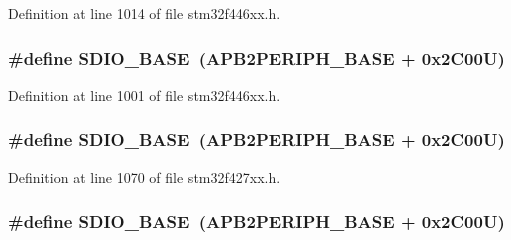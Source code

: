 Definition at line 1014 of file stm32f446xx.\+h.

\subsubsection[{\texorpdfstring{S\+D\+I\+O\+\_\+\+B\+A\+SE}{SDIO_BASE}}]{\setlength{\rightskip}{0pt plus 5cm}\#define S\+D\+I\+O\+\_\+\+B\+A\+SE~({\bf A\+P\+B2\+P\+E\+R\+I\+P\+H\+\_\+\+B\+A\+SE} + 0x2\+C00\+U)}\hypertarget{group___peripheral__memory__map_ga95dd0abbc6767893b4b02935fa846f52}{}\label{group___peripheral__memory__map_ga95dd0abbc6767893b4b02935fa846f52}


Definition at line 1001 of file stm32f446xx.\+h.

\subsubsection[{\texorpdfstring{S\+D\+I\+O\+\_\+\+B\+A\+SE}{SDIO_BASE}}]{\setlength{\rightskip}{0pt plus 5cm}\#define S\+D\+I\+O\+\_\+\+B\+A\+SE~({\bf A\+P\+B2\+P\+E\+R\+I\+P\+H\+\_\+\+B\+A\+SE} + 0x2\+C00\+U)}\hypertarget{group___peripheral__memory__map_ga95dd0abbc6767893b4b02935fa846f52}{}\label{group___peripheral__memory__map_ga95dd0abbc6767893b4b02935fa846f52}


Definition at line 1070 of file stm32f427xx.\+h.

\subsubsection[{\texorpdfstring{S\+D\+I\+O\+\_\+\+B\+A\+SE}{SDIO_BASE}}]{\setlength{\rightskip}{0pt plus 5cm}\#define S\+D\+I\+O\+\_\+\+B\+A\+SE~({\bf A\+P\+B2\+P\+E\+R\+I\+P\+H\+\_\+\+B\+A\+SE} + 0x2\+C00\+U)}\hypertarget{group___peripheral__memory__map_ga95dd0abbc6767893b4b02935fa846f52}{}\label{group___peripheral__memory__map_ga95dd0abbc6767893b4b02935fa846f52}


